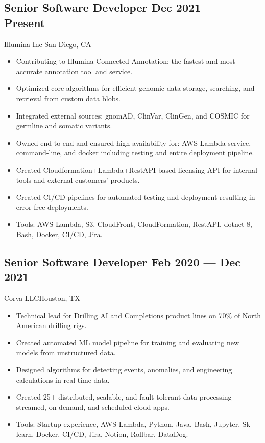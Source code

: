 \documentclass[letter,10pt]{article}
\newcommand{\subtext}[1]{
	#1\par\vspace{-0.2cm}}
\newenvironment{zitemize}{
	\begin{itemize}\itemsep0pt \parskip0pt \parsep1pt}
	{\end{itemize}\vspace{-0.5cm}}
\begin{document}
	\subsection*{Senior Software Developer \hfill Dec 2021 --- Present} 
	\subtext{Illumina Inc \hfill San Diego, CA} 
	\begin{zitemize}
		\item Contributing to Illumina Connected Annotation: the fastest and most accurate annotation tool and service.
		\item Optimized core algorithms for efficient genomic data storage, searching, and retrieval from custom data blobs.
		\item Integrated external sources: gnomAD, ClinVar, ClinGen, and COSMIC for germline and somatic variants.
		\item Owned end-to-end and ensured high availability for: AWS Lambda service, command-line, and  docker including testing and entire deployment pipeline.
		\item Created Cloudformation+Lambda+RestAPI based licensing API for internal tools and external customers' products.
		\item Created CI/CD pipelines for automated testing and deployment resulting in error free deployments.
		\item Tools: AWS Lambda, S3, CloudFront, CloudFormation, RestAPI, dotnet 8, Bash, Docker, CI/CD, Jira.
	\end{zitemize}
	
	\vspace{0.3 cm}
	\subsection*{Senior Software Developer \hfill Feb 2020 --- Dec 2021} 
	\subtext{Corva LLC\hfill Houston, TX} 
	\begin{zitemize}
		\item Technical lead for Drilling AI and Completions product lines on 70\% of North American drilling rigs.
		\item Created automated ML model pipeline for training and evaluating new models from unstructured data.
		\item Designed algorithms for detecting events, anomalies, and engineering calculations in real-time data.
		\item Created 25+ distributed, scalable, and fault tolerant data processing streamed, on-demand, and scheduled cloud apps.
		\item Tools: Startup experience, AWS Lambda, Python, Java, Bash, Jupyter, Sk-learn, Docker, CI/CD, Jira, Notion, Rollbar, DataDog.
	\end{zitemize}
	
\end{document}
